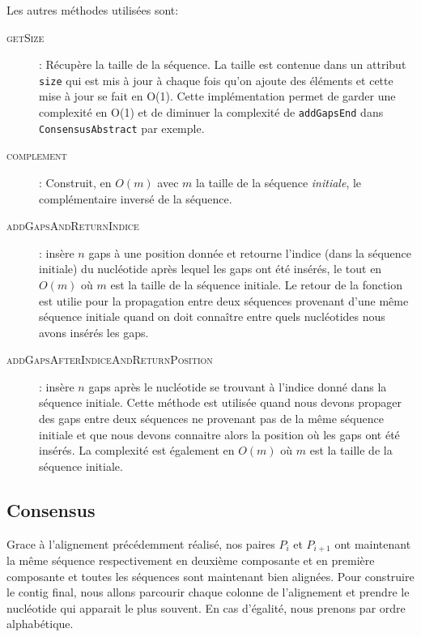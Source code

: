 Les autres méthodes utilisées sont:
\begin{description}
	\item[\textsc{getSize}]: Récupère la taille de la séquence. La taille est
		contenue dans un attribut \verb|size| qui est mis à jour à chaque fois
		qu'on ajoute des éléments et cette mise à jour se fait en O(1). Cette
		implémentation permet de garder une complexité en O(1) et de diminuer la
		complexité de \verb|addGapsEnd| dans \verb|ConsensusAbstract| par
		exemple.
	\item[\textsc{complement}]: Construit, en $O(m)$ avec $m$ la taille de la
		séquence \textit{initiale}, le complémentaire inversé de la séquence.
	\item[\textsc{addGapsAndReturnIndice}]: insère $n$ gaps à
			une position donnée et retourne l'indice (dans la séquence initiale)
			du nucléotide après lequel les gaps ont été insérés, le tout en
			$O(m)$ où $m$ est la taille de la séquence initiale. Le retour de
			la fonction est utilie pour la propagation entre deux séquences
			provenant d'une même séquence initiale quand on doit connaître
			entre quels nucléotides nous avons insérés les gaps.
	\item[\textsc{addGapsAfterIndiceAndReturnPosition}]: insère $n$ gaps après
		le nucléotide se trouvant à l'indice donné dans la séquence initiale.
		Cette méthode est utilisée quand nous devons propager des gaps entre
		deux séquences ne provenant pas de la même séquence initiale et que nous
		devons connaitre alors la position où les gaps ont été insérés. La
		complexité est également en $O(m)$ où $m$ est la taille de la séquence
		initiale.
\end{description}

\subsection{Consensus}
\label{subsection:consensus}

Grace à l'alignement précédemment réalisé, nos paires $P_{i}$ et $P_{i + 1}$ ont
maintenant la même séquence respectivement en deuxième composante et en première
composante et toutes les séquences sont maintenant bien alignées. Pour
construire le contig final, nous allons parcourir chaque colonne de l'alignement
et prendre le nucléotide qui apparait le plus souvent. En cas d'égalité, nous
prenons par ordre alphabétique.


